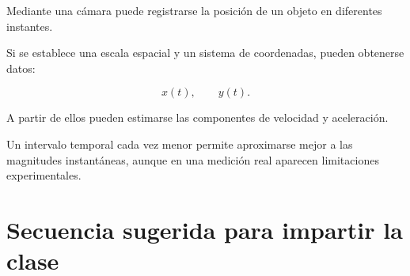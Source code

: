 \begin{aplicacion}
Mediante una cámara puede registrarse la posición de un objeto en diferentes
instantes.

Si se establece una escala espacial y un sistema de coordenadas, pueden
obtenerse datos:

\[
x(t),
\qquad
y(t).
\]

A partir de ellos pueden estimarse las componentes de velocidad y aceleración.

Un intervalo temporal cada vez menor permite aproximarse mejor a las magnitudes
instantáneas, aunque en una medición real aparecen limitaciones experimentales.
\end{aplicacion}


\section{Secuencia sugerida para impartir la clase}

